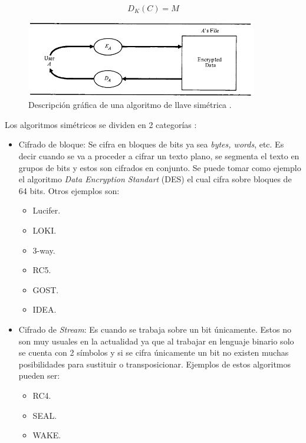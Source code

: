 \begin{equation}\label{eqDescifradoSimetrico}
D_K (C) = M
\end{equation}


\begin{figure}
	\centering
	\includegraphics[width=0.9\textwidth]{./images/figSimmetricKeyAlgorithm}
	\caption{Descripción gráfica de una algoritmo de llave simétrica \citep{denning}.}
	\label{figSimmetricKeyAlgorithm}
\end{figure}


Los algoritmos simétricos se dividen en 2 categorías \citep{bruce}:

\begin{itemize}
\item Cifrado de bloque: Se cifra en bloques de bits ya sea \textit{bytes, words}, etc. Es decir cuando se va a proceder a cifrar un texto plano, se segmenta el texto en grupos de bits y estos son cifrados en conjunto. Se puede tomar como ejemplo el algoritmo \textit{Data Encryption Standart} (DES) el cual cifra sobre bloques de 64 bits. Otros ejemplos son:
\begin{itemize}
\item Lucifer.
\item LOKI.
\item 3-way.
\item RC5.
\item GOST.
\item IDEA.
\end{itemize}

\item Cifrado de \textit{Stream}: Es cuando se trabaja sobre un bit únicamente. Estos no son muy usuales en la actualidad ya que al trabajar en lenguaje binario solo se cuenta con 2 símbolos y si se cifra únicamente un bit no existen muchas posibilidades para sustituir o transposicionar.
Ejemplos de estos algoritmos pueden ser:
\begin{itemize}
\item RC4.
\item SEAL.
\item WAKE.
\end{itemize}
\end{itemize}

